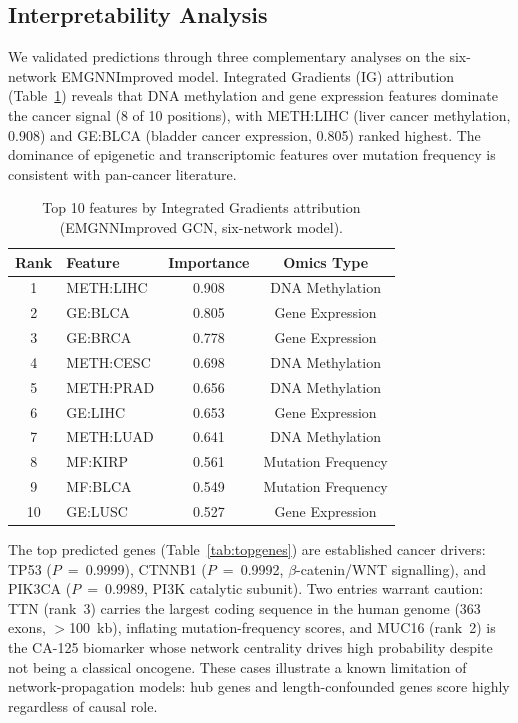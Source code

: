 \subsection{Interpretability Analysis}

We validated predictions through three complementary analyses on the six-network
EMGNNImproved model. Integrated Gradients (IG) attribution (Table~\ref{tab:featimp})
reveals that DNA methylation and gene expression features dominate the cancer signal
(8 of 10 positions), with METH:LIHC (liver cancer methylation, 0.908) and GE:BLCA
(bladder cancer expression, 0.805) ranked highest. The dominance of epigenetic and
transcriptomic features over mutation frequency is consistent with pan-cancer
literature\cite{emogi2021,hanahan2022}.

\begin{table}[ht]
  \centering
  \caption{Top 10 features by Integrated Gradients attribution (EMGNNImproved GCN,
           six-network model).}
  \label{tab:featimp}
  \small
  \begin{tabular}{clcc}
    \toprule
    \textbf{Rank} & \textbf{Feature} & \textbf{Importance} & \textbf{Omics Type} \\
    \midrule
     1 & METH:LIHC & 0.908 & DNA Methylation \\
     2 & GE:BLCA   & 0.805 & Gene Expression \\
     3 & GE:BRCA   & 0.778 & Gene Expression \\
     4 & METH:CESC & 0.698 & DNA Methylation \\
     5 & METH:PRAD & 0.656 & DNA Methylation \\
     6 & GE:LIHC   & 0.653 & Gene Expression \\
     7 & METH:LUAD & 0.641 & DNA Methylation \\
     8 & MF:KIRP   & 0.561 & Mutation Frequency \\
     9 & MF:BLCA   & 0.549 & Mutation Frequency \\
    10 & GE:LUSC   & 0.527 & Gene Expression \\
    \bottomrule
  \end{tabular}
\end{table}

The top predicted genes (Table~\ref{tab:topgenes}) are established cancer drivers:
TP53 ($P$~=~0.9999), CTNNB1 ($P$~=~0.9992, $\beta$-catenin/WNT signalling), and
PIK3CA ($P$~=~0.9989, PI3K catalytic subunit). Two entries warrant caution: TTN
(rank~3) carries the largest coding sequence in the human genome (363 exons,
$>$100~kb), inflating mutation-frequency scores\cite{lawrence2013}, and MUC16
(rank~2) is the CA-125 biomarker whose network centrality drives high probability
despite not being a classical oncogene. These cases illustrate a known limitation
of network-propagation models: hub genes and length-confounded genes score highly
regardless of causal role.

